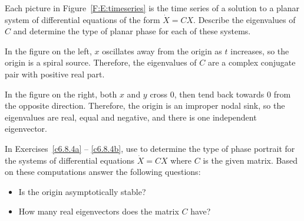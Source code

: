 \documentclass{ximera}
\begin{document}
\begin{exercise} \label{c6.8.3}
Each picture in Figure~\ref{F:E:timeseries} is the time series of a
solution to a planar system of differential equations of the form
$\dot{X}=CX$.  Describe the eigenvalues of $C$ and determine the type
of planar phase for each of these systems.

\begin{solution}

In the figure on the left, $x$ oscillates away from the origin as $t$
increases, so the origin is a spiral source.  Therefore, the eigenvalues
of $C$ are a complex conjugate pair with positive real part.

\para In the figure on the right, both $x$ and $y$ cross $0$, then
tend back towards $0$ from the opposite direction.  Therefore, the origin
is an improper nodal sink, so the eigenvalues are real, equal and
negative, and there is one independent eigenvector.

\end{solution}
\end{exercise}
\begin{figure*}[htb]
        \centerline{%
        }
	\caption{Time series for planar systems.}
	\label{F:E:timeseries}
\end{figure*}




\noindent In Exercises~\ref{c6.8.4a} -- \ref{c6.8.4b}, use {\pplane} to
determine the type of phase portrait for the systems of differential equations
$\dot{X}=CX$ where $C$ is the given matrix.  Based on these computations
answer the following questions:
\begin{itemize}
\item[(a)]  Is the origin asymptotically stable?
\item[(b)]  How many real eigenvectors does the matrix $C$ have?
\end{itemize}
\end{document}
